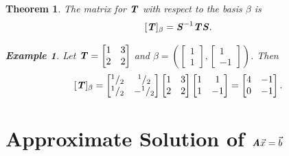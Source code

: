\documentclass[12pt, a4paper]{article}
\newtheorem{thm}{Theorem}[subsection]
\newtheorem{eg}{Example}[subsection]
\def\T{{\textbf{\emph{T}}}}
\def\vecx{\vec{x}}
\def\vecb{\vec{b}}
\def\matrixA{\textbf{\emph{A}}}
\def\matrixS{\textbf{\emph{S}}}
\begin{document}
\begin{thm}
	The matrix for $\T$ with respect to the basis $\beta$ is \[[\T]_\beta=\matrixS^{-1}\T\matrixS.\]	
	\begin{eg}
		Let $\T=\begin{bmatrix}1&3\\2&2\end{bmatrix}$ and $\beta=\left(\begin{bmatrix}1\\1\end{bmatrix},\begin{bmatrix}1\\-1\end{bmatrix}\right)$. Then \[[\T]_\beta=\begin{bmatrix}^1/_2&^1/_2\\^1/_2&-^1/_2\end{bmatrix}\begin{bmatrix}1&3\\2&2\end{bmatrix}\begin{bmatrix}1&1\\1&-1\end{bmatrix}=\begin{bmatrix}4&-1\\0&-1\end{bmatrix}.\]
	\end{eg}
\end{thm}

\newpage
\section{Approximate Solution of $\matrixA\vecx=\vecb$}
\end{document}
